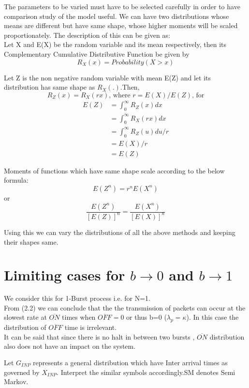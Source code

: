 The parameters to be varied must have to be selected carefully in order to have comparison study of the model useful. We can have two distributions whose means are different but have same shape, whose higher moments will be scaled proportionately. The description of this can be given as:\\
Let X and E(X) be the random variable and its mean respectively, then its Complementary Cumulative Distributive Function be given by\\
\begin{equation}
	R_X{(x)} = Probability(X > x)
\end{equation}

Let Z is the non negative random variable with mean E(Z) and let its distribution has same shape as $R_X(.)$.Then, \\
\[R_Z{(x)} = R_X{(rx)}\text{, where }  r = E(X)/E(Z)\text{, for}\]
\begin{align*}
 E(Z) &=\int_{0}^{\infty} R_Z{(x)} dx\\
 &= \int_{0}^{\infty} R_X{(rx)} dx\\
 &= \int_{0}^{\infty} R_Z{(u)} du/r\\
 &= E(X)/r\\
 &= E(Z) 
\end{align*}
\begin{remark}
Moments of functions which have same shape scale according to the below formula:
\begin{equation}
E(Z^n) = r^nE(X^n)
\end{equation}
or
\begin{equation}
\frac{E(Z^n)}{[E(Z)]^n} = \frac{E(X^n)}{[E(X)]^n}
\end{equation}
\end{remark}

Using this we can vary the distributions of all the above methods and keeping their shapes same.\\

\section{Limiting cases for $b\rightarrow 0$ and $b\rightarrow 1$}
We consider this for 1-Burst process i.e. for N=1.\\
From (2.2) we can conclude that the the transmission of packets can occur at the slowest rate at $\overline{ON}$ times when $\overline{OFF} = 0$ or thus b=0 ($\lambda_{p} = \kappa$). In this case the distribution of $\overline{OFF}$ time is irrelevant.\\
It can be said that since there is no halt in between two bursts , $\overline{ON}$ distribution also does not have an impact on the system.
\begin{remark}
Let $G_{INP}$ represents a general distribution which have Inter arrival times as governed by $X_{INP}$. Interpret the similar symbols accordingly.SM denotes Semi Markov.
\end{remark}


